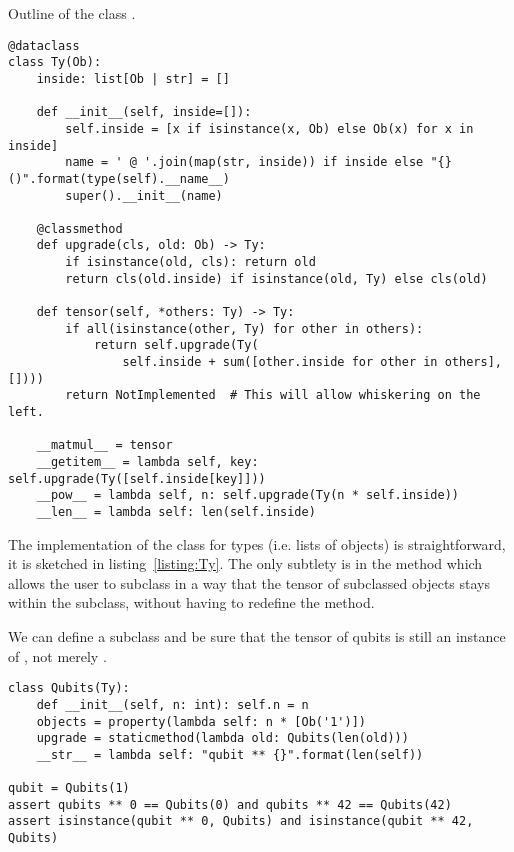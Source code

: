 \begin{python}\label{listing:Ty}
{\normalfont Outline of the class .}
\begin{verbatim}
@dataclass
class Ty(Ob):
    inside: list[Ob | str] = []

    def __init__(self, inside=[]):
        self.inside = [x if isinstance(x, Ob) else Ob(x) for x in inside]
        name = ' @ '.join(map(str, inside)) if inside else "{}()".format(type(self).__name__)
        super().__init__(name)

    @classmethod
    def upgrade(cls, old: Ob) -> Ty:
        if isinstance(old, cls): return old
        return cls(old.inside) if isinstance(old, Ty) else cls(old)

    def tensor(self, *others: Ty) -> Ty:
        if all(isinstance(other, Ty) for other in others):
            return self.upgrade(Ty(
                self.inside + sum([other.inside for other in others], [])))
        return NotImplemented  # This will allow whiskering on the left.

    __matmul__ = tensor
    __getitem__ = lambda self, key: self.upgrade(Ty([self.inside[key]]))
    __pow__ = lambda self, n: self.upgrade(Ty(n * self.inside))
    __len__ = lambda self: len(self.inside)
\end{verbatim}
\end{python}

The implementation of the class  for types (i.e. lists of objects) is straightforward, it is sketched in listing~\ref{listing:Ty}.
The only subtlety is in the method  which allows the user to subclass  in a way that the tensor of subclassed objects stays within the subclass, without having to redefine the  method.

\begin{example}
We can define a  subclass and be sure that the tensor of qubits is still an instance of , not merely .

\begin{verbatim}
class Qubits(Ty):
    def __init__(self, n: int): self.n = n
    objects = property(lambda self: n * [Ob('1')])
    upgrade = staticmethod(lambda old: Qubits(len(old)))
    __str__ = lambda self: "qubit ** {}".format(len(self))

qubit = Qubits(1)
assert qubits ** 0 == Qubits(0) and qubits ** 42 == Qubits(42)
assert isinstance(qubit ** 0, Qubits) and isinstance(qubit ** 42, Qubits)
\end{verbatim}
\end{example}

